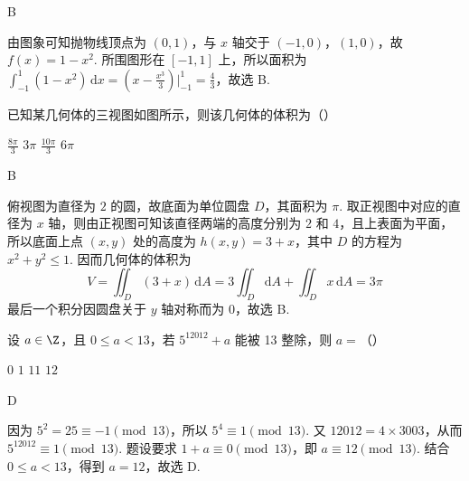 \begin{answer}
B
\end{answer}

\begin{solution}
由图象可知抛物线顶点为 \((0,1)\)，与 \(x\) 轴交于 \((-1,0)\)，\((1,0)\)，故 \(f(x)=1-x^2\). 所围图形在 \([-1,1]\) 上，所以面积为 \(\displaystyle\int_{-1}^{1}(1-x^2)\,\mathrm{d}x=\left(x-\frac{x^3}{3}\right)\bigg|_{-1}^{1}=\frac{4}{3}\)，故选 B.
\end{solution}

\begin{problem}
已知某几何体的三视图如图所示，则该几何体的体积为（\quad）


\choices
    {\(\frac{8\pi}{3}\)}
    {\(3\pi\)}
    {\(\frac{10\pi}{3}\)}
    {\(6\pi\)}
\end{problem}

\begin{answer}
B
\end{answer}

\begin{solution}
俯视图为直径为 \(2\) 的圆，故底面为单位圆盘 \(D\)，其面积为 \(\pi\). 取正视图中对应的直径为 \(x\) 轴，则由正视图可知该直径两端的高度分别为 \(2\) 和 \(4\)，且上表面为平面，所以底面上点 \((x,y)\) 处的高度为 \(h(x,y)=3+x\)，其中 \(D\) 的方程为 \(x^2+y^2\leqslant1\). 因而几何体的体积为
\[
V=\iint_D(3+x)\,\mathrm{d}A=3\iint_D\mathrm{d}A+\iint_Dx\,\mathrm{d}A=3\pi
\]
最后一个积分因圆盘关于 \(y\) 轴对称而为 \(0\)，故选 B.
\end{solution}

\begin{problem}
设 \(a \in \Z\)，且 \(0 \leqslant a < 13\)，若 \(5^{12012} + a\) 能被 13 整除，则 \(a =\)（\quad）

\choices
    {\(0\)}
    {\(1\)}
    {\(11\)}
    {\(12\)}
\end{problem}

\begin{answer}
D
\end{answer}

\begin{solution}
因为 \(5^2=25\equiv-1\pmod {13}\)，所以 \(5^4\equiv1\pmod {13}\). 又 \(12012=4\times3003\)，从而 \(5^{12012}\equiv1\pmod {13}\). 题设要求 \(1+a\equiv0\pmod {13}\)，即 \(a\equiv12\pmod {13}\). 结合 \(0\leqslant a<13\)，得到 \(a=12\)，故选 D.
\end{solution}

